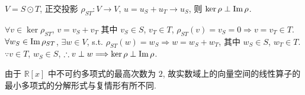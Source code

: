 \documentclass{note}
\begin{document}
\begin{cor}\label{cor-10.1}
    $V=S\odot T$, 正交投影 $\rho_{ST}:V\rightarrow V$, $u=u_S+u_T\rightarrow u_S$, 则 $\ker\rho\perp\operatorname{Im}\rho$.
\end{cor}
\begin{pf}
    $\forall v\in\ker\rho_{ST}$, $v=v_S+v_T$ 其中 $v_S\in S$, $v_T\in T$, $\rho_{ST}(v)=v_S=0\Longrightarrow v=v_T\in T$.\\
    $\forall w_S\in\operatorname{Im}\rho_{ST}$, $\exists w\in V$, s.t. $\rho_{ST}(w)=w_S\Longrightarrow w=w_S+w_T$, 其中 $w_S\in S$, $w_T\in T$.\\
    $\because v\in T$, $w_S\in S$, $\therefore v\perp w\Longrightarrow\ker\rho\perp\operatorname{Im}\rho$.
\end{pf}

由于 $\mathbb{R}[x]$ 中不可约多项式的最高次数为 $2$, 故实数域上的向量空间的线性算子的最小多项式的分解形式与复情形有所不同.
\end{document}
